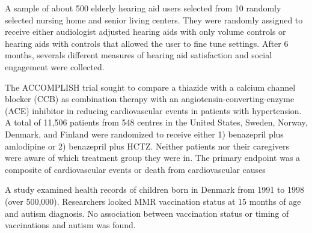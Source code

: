 \documentclass{article}
\begin{document}
\begin{flushleft}
\begin{enumalpha}
\item A sample of about 500 elderly hearing aid users selected from 10 randomly selected nursing home and senior living centers. They were randomly assigned to receive either audiologist adjusted hearing aids with only volume controls or hearing aids with controls that allowed the user to fine tune settings. After 6 months, severals different measures of hearing aid satisfaction and social engagement were collected.
\vspace{1in}

\item The ACCOMPLISH trial sought to compare a thiazide with a calcium channel blocker (CCB) as combination therapy with an angiotensin-converting-enzyme (ACE) inhibitor in reducing cardiovascular events in patients with hypertension. A total of 11,506 patients from 548 centres in the United States, Sweden, Norway, Denmark, and Finland were randomized to receive either 1) benazepril plus amlodipine or 2) benazepril plus HCTZ. Neither patients nor their caregivers were aware of which treatment group they were in. The primary endpoint was a composite of cardiovascular events or death from cardiovascular causes
\vspace{1in}

\item A study examined health records of children born in Denmark from 1991 to 1998 (over 500,000). Researchers looked MMR vaccination status at 15 months of age and autism diagnosis. No association between vaccination status or timing of vaccinations and autism was found.
\end{enumalpha} 
\end{flushleft}
\end{document}
